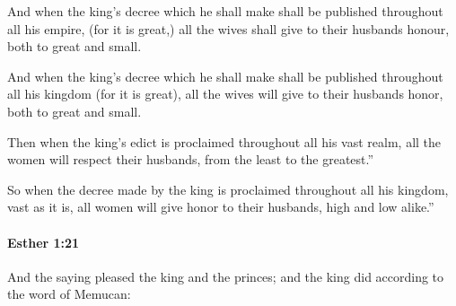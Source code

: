 			And when the king’s decree which he shall make shall be published throughout all his empire, (for it is great,) all the wives shall give to their husbands honour, both to great and small.

			\begin{versebox}
					\item[BHS] 
					\item[LXX] 
					\item[ASV] And when the king's decree which he shall make shall be published throughout all his kingdom (for it is great), all the wives will give to their husbands honor, both to great and small.
					\item[NIV] Then when the king’s edict is proclaimed throughout all his vast realm, all the women will respect their husbands, from the least to the greatest.”
					\item[NRSV] So when the decree made by the king is proclaimed throughout all his kingdom, vast as it is, all women will give honor to their husbands, high and low alike.”
			\end{versebox}

		\paragraph{Esther 1:21} %
			\label{ESTHER-1-21}

			And the saying pleased the king and the princes; and the king did according to the word of Memucan:


